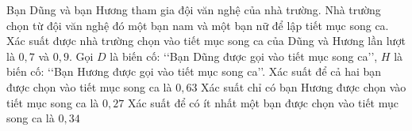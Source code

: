 \begin{ex}%

	Bạn Dũng và bạn Hương tham gia đội văn nghệ của nhà trường. Nhà trường chọn từ đội văn nghệ đó một bạn nam và một bạn nữ để lập tiết mục song ca. Xác suất được nhà trường chọn vào tiết mục song ca của Dũng và Hương lần lượt là $0{,}7$ và $0{,}9$. Gọi $D$ là biến cố: \lq\lq Bạn Dũng được gọi vào tiết mục song ca\rq\rq, $H$ là biến cố: \lq\lq Bạn Hương được gọi vào tiết mục song ca\rq\rq.
	{\True Xác suất để cả hai bạn được chọn vào tiết mục song ca là $0{,}63$}
	{\True Xác suất chỉ có bạn Hương được chọn vào tiết mục song ca là $0{,}27$}
	{Xác suất để có ít nhất một bạn được chọn vào tiết mục song ca là $0{,}34$}

\end{ex}

